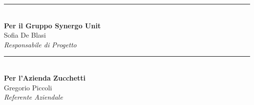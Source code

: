 \vspace{2.5cm}

\noindent
\begin{minipage}[c]{0.45\textwidth}
	\begin{center}
		\rule{6cm}{0.4pt} \\ 
		\vspace{0.2cm}
		\textbf{Per il Gruppo Synergo Unit} \\
		Sofia De Blasi \\
		\textit{Responsabile di Progetto}
	\end{center}
\end{minipage}
\hfill
\begin{minipage}[c]{0.45\textwidth}
	\begin{center}
		\rule{6cm}{0.4pt} \\ 
		\vspace{0.2cm}
		\textbf{Per l'Azienda Zucchetti} \\
		{Gregorio Piccoli} \\
		\textit{Referente Aziendale}
	\end{center}
\end{minipage}

\vspace{2cm}